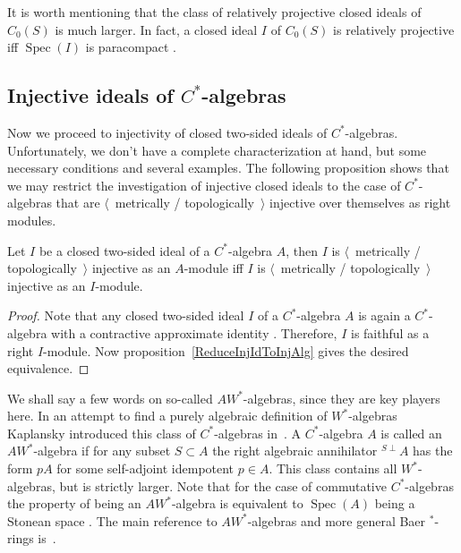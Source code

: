 It is worth mentioning that the class of relatively projective closed ideals of
$C_0(S)$ is much larger. In fact, a closed ideal $I$ of $C_0(S)$ is relatively
projective iff $\operatorname{Spec}(I)$ is paracompact
\cite[chapter IV,\S\S 2--3]{HelHomolBanTopAlg}.


\subsection{
    Injective ideals of \texorpdfstring{$C^*$}{C*}-algebras}\label{
SubSectionInjectiveIdealsOfCStarAlgebras}

Now we proceed to injectivity of closed two-sided ideals of $C^*$-algebras.
Unfortunately, we don't have a complete characterization at hand, but some
necessary conditions and several examples. The following proposition shows that
we may restrict the investigation of injective closed ideals to the case of $C^*$-algebras
that are $\langle$~metrically / topologically~$\rangle$ injective over themselves as
right modules.

\begin{proposition}\label{MetTopInjOvrAlgIffOvrItslf} Let $I$ be a closed two-sided
ideal of a $C^*$-algebra $A$, then $I$ is $\langle$~metrically /
topologically~$\rangle$ injective as an $A$-module iff $I$ is $\langle$~metrically
/ topologically~$\rangle$ injective as an $I$-module.
\end{proposition}
\begin{proof} Note that any closed two-sided ideal $I$ of a $C^*$-algebra $A$ is again
a $C^*$-algebra with a contractive approximate identity \cite[theorem 4.7.79]{HelBanLocConvAlg}. Therefore, $I$ is faithful as a right $I$-module. Now
proposition~\ref{ReduceInjIdToInjAlg} gives the desired equivalence.
\end{proof}

We shall say a few words on so-called $AW^*$-algebras, since they are key
players here. In an attempt to find a purely algebraic definition of
$W^*$-algebras Kaplansky introduced this class of $C^*$-algebras
in~\cite{KaplProjInBanAlg}. A $C^*$-algebra $A$ is called an $AW^*$-algebra if
for any subset $S\subset A$ the right algebraic annihilator
${}^{S\perp}A$ has the form $pA$ for
some self-adjoint idempotent $p\in A$. This class contains all $W^*$-algebras,
but is strictly larger. Note that for the case of commutative $C^*$-algebras the
property of being an $AW^*$-algebra is equivalent to  $\operatorname{Spec}(A)$
being a Stonean space \cite[theorem 1.7.1]{BerbBaerStarRings}. The main
reference to $AW^*$-algebras and more general Baer ${}^*$-rings
is~\cite{BerbBaerStarRings}. 

